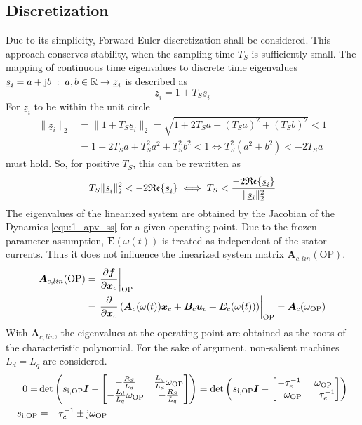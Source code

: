 \subsection{Discretization}
Due to its simplicity, Forward Euler discretization shall be considered. This approach conserves stability, when the sampling time $T_S$ is sufficiently small. The mapping of continuous time eigenvalues to discrete time eigenvalues $\underline{s}_i = a + \mathrm{j} b \; : \; a,b \in \mathbb{R} \rightarrow \underline{z}_i$ is described as
\[
\underline{z}_i = 1 + T_S \underline{s}_i
\]
For $\underline{z}_i$ to be within the unit circle
\begin{equation*}
    \begin{split}
        \| \underline{z}_i \|_2& = \| 1 + T_S \underline{s}_i \|_2 = \sqrt{1 + 2T_S a + (T_S a)^2  + (T_S b)^2} < 1\\ 
  &= 1 + 2T_S a + T_S^2 a^2  + T_S^2 b^2 < 1 \iff  T_S^2 (a^2 + b^2) < - 2 T_S a
    \end{split}
\end{equation*}
must hold. So, for positive $T_S$, this can be rewritten as
\[
T_S \| \underline{s}_i \|^2_2 < -2 \mathfrak{Re}\{\underline{s}_i\} \iff T_S < \frac{ -2 \mathfrak{Re}\{\underline{s}_i\}}{ \| \underline{s}_i \|^2_2}
\]
The eigenvalues of the linearized system are obtained by the Jacobian of the Dynamics  \eqref{equ:1_apv_ss} for a given operating point. Due to the frozen parameter assumption, $\bm{E}(\omega(t))$ is treated as independent of the stator currents. Thus it does not influence the linearized system matrix $\bm{A}_{c,lin}(\mathrm{OP})$.
\begin{equation}
\begin{split}
    \bm{A}_{c,lin}(\mathrm{OP})
    &=  \left.
	\frac{\partial\bm{f}}{\partial\bm{x}_c}
	\right|_{\mathrm{OP}} \\ 
    &= 
    \left.
	\frac{\partial}{\partial\bm{x}_c} 
    \left(
    \bm{A}_{c}(\omega(t)) {\bm{x}}_c + \bm{B}_c {\bm{u}_c} + \bm{E}_c(\omega(t))
    \right)
	\right|_{\mathrm{OP}} = 
    \bm{A}_{c}(\omega_{\mathrm{OP}})
\end{split}
    \label{equ:2_OP_lin}
\end{equation}
With $\bm{A}_{c,lin}$, the eigenvalues at the operating point are obtained as the roots of the characteristic polynomial. For the sake of argument, non-salient machines $L_d = L_q$ are considered.  
\begin{equation*}
    \begin{split}
        0 =& \det \left( s_{\mathrm{i,OP}}\bm{I} - 
    \begin{bmatrix}
		-\frac{R_S}{L_d} & \frac{L_q}{L_d} \omega_\mathrm{OP}\\ -\frac{L_d}{L_q} \omega_\mathrm{OP} & -\frac{R_S}{L_q}
	\end{bmatrix} \right) = \det \left( s_{\mathrm{i,OP}} \bm{I} - 
    \begin{bmatrix}
        -\tau_e^{-1} & \omega_\mathrm{OP} \\ - \omega_\mathrm{OP} & -\tau_e^{-1}
    \end{bmatrix} \right) \\
   s_{\mathrm{i,OP}} &= - \tau_e^{-1} \pm \mathrm{j} \omega_\mathrm{OP}
    \end{split}
\end{equation*}
